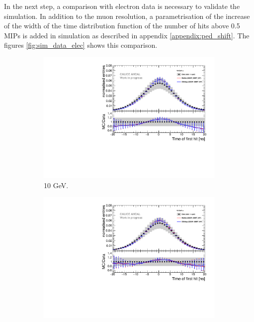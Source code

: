 In the next step, a comparison with electron data is necessary to validate the simulation. In addition to the muon resolution, a parametrisation of the increase of the width of the time distribution function of the number of hits above 0.5 MIPs is added in simulation as described in appendix \ref{appendix:ped_shift}. The figures \ref{fig:sim_data_elec} shows this comparison.

\begin{figure}[htbp!]
	\begin{subfigure}[t]{0.45\textwidth}
		\centering
		\includegraphics[width=1\textwidth]{chap5/fig_AHCAL_timing/Electrons/Comparison_SimData_Electrons10GeV.pdf}
		\caption{10 GeV.}\label{fig:elec_sim_data_10GeV}
	\end{subfigure}
	\hfill
	\begin{subfigure}[t]{0.45\textwidth}
		\centering
		\includegraphics[width=1\textwidth]{chap5/fig_AHCAL_timing/Electrons/Comparison_SimData_Electrons15GeV.pdf}

\end{subfigure}
\end{figure}
